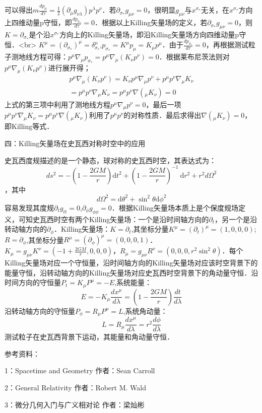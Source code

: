 可以得出$m\frac{d p_{\mu}}{d \tau}=\frac{1}{2}\left(\partial_{\mu} g_{\nu \lambda}\right) p^{\lambda} p^{\nu}$．若$\partial_{\sigma_{*}} g_{\mu \nu}=0$，很明显$g_{\mu \nu}$与$x^{\sigma_{*}}$无关，在$x^{\sigma_{*}}$方向上四维动量p守恒，即$\frac{d p_{\sigma_{*}}}{d \tau}=0$．根据以上Killing矢量场的定义，若$\partial_{\sigma_{*}} g_{\mu \nu}=0$，则$K=\partial_{\sigma_{*}}$是个沿$x^{\sigma_{*}}$方向上的Killing矢量场，即沿Killing矢量场方向四维动量p守恒．<br>
$K^{\mu}=(\partial_{\sigma_{*}})^{\mu}=\delta_{\sigma_{*}}^{\mu}$,$p_{\sigma_{*}}=K^{\mu}p_{\mu}=K_{\mu}p^{\mu}$．由于$\frac{d p_{\sigma_{*}}}{d \tau}=0$，再根据测试粒子测地线方程可得：$p^{\mu} \nabla_{\mu} p_{\sigma_{*}}=p^{\mu} \nabla_{\mu}(K_{\nu}p^{\nu}) =0$．根据莱布尼茨法则对$p^{\mu} \nabla_{\mu}(K_{\nu}p^{\nu})$进行展开得；
$$\begin{aligned}
p^{\mu} \nabla_{\mu}(K_{\nu}p^{\nu})=K_{\nu}p^{\mu} \nabla_{\mu}p^{\nu}+p^{\mu} p^{\nu}\nabla_{\mu}K_{\nu}\\
=p^{\mu} p^{\nu}\nabla_{\mu}K_{\nu}=p^{\mu} p^{\nu}\nabla(_{\mu}K_{\nu})=0
\end{aligned}$$
上式的第三项中利用了测地线方程$p^{\mu} \nabla_{\mu}p^{\nu}=0$，最后一项$p^{\mu} p^{\nu}\nabla_{\mu}K_{\nu}=p^{\mu} p^{\nu}\nabla(_{\mu}K_{\nu})$利用了$p^{\mu} p^{\nu}$的对称性质．最后求得出$\nabla(_{\mu}K_{\nu})=0$，即Killing等式．

四：Killing矢量场在史瓦西对称时空中的应用

史瓦西度规描述的是一个静态，球对称的史瓦西时空，其表达式为：
$$d s^{2}=-\left(1-\frac{2 G M}{r}\right) \mathrm{d} t^{2}+\left(1-\frac{2 G M}{r}\right)^{-1} \mathrm{~d} r^{2}+r^{2} d \Omega^{2}$$，其中$$d \Omega^{2}=\mathrm{d} \theta^{2}+\sin ^{2} \theta \mathrm{d} \phi^{2}$$
容易发现其度规$\partial_{t} g_{tt}=0$,$\partial_{\phi} g_{\phi\phi}=0$．根据Killing矢量场本质上是个保度规场定义，可知史瓦西时空有两个Killing矢量场：一个是沿时间轴方向的$\partial_{t}$，另一个是沿转动轴方向的$\partial_{\phi}$．Killing矢量场：$K=\partial_{t}$,其坐标分量$K^{\mu}=\left(\partial_{t}\right)^{\mu}=(1,0,0,0)$;$R=\partial_{\phi}$,其坐标分量$R^{\mu}=\left(\partial_{\phi}\right)^{\mu}=(0,0,0,1)$．$K_{\mu}=g_{\mu \nu}K^{\nu}=(-1+\frac{2 G M}{r},0,0,0)$，$R_{\mu}=g_{\mu \nu}R^{\nu}=(0,0,0,r^{2}\sin ^{2} \theta )$．每个Killing矢量场对应一个守恒量，沿时间轴方向的Killing矢量场对应该时空背景下的能量守恒，沿转动轴方向的Killing矢量场对应史瓦西时空背景下的角动量守恒．沿时间方向的守恒量$P_{t}=K_{\mu}P^{\mu}=-E$,系统能量：$$E=-K_{\mu} \frac{d x^{\mu}}{d \lambda}=\left(1-\frac{2 G M}{r}\right) \frac{d t}{d \lambda}$$
沿转动轴方向的守恒量$P_{\phi}=R_{\mu}P^{\mu}=L$,系统角动量：$$L=R_{\mu} \frac{d x^{\mu}}{d \lambda}=r^{2} \frac{d \phi}{d \lambda}$$
测试粒子在史瓦西背景下运动，其能量和角动量守恒．

参考资料：

1：Spacetime and Geometry 作者：Sean Carroll

2：General Relativity   作者：Robert M. Wald

3：微分几何入门与广义相对论  作者：梁灿彬